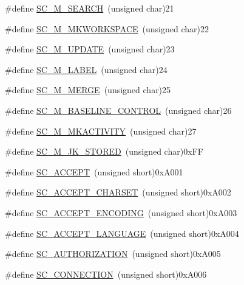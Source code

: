 \begin{DoxyCompactItemize}
\item 
\#define \hyperlink{group__AJP__defines_ga176f8a8d190ca4a417746c92d4d426f7}{S\+C\+\_\+\+M\+\_\+\+S\+E\+A\+R\+CH}~(unsigned char)21
\item 
\#define \hyperlink{group__AJP__defines_ga44a79edc18306269e01f153ea2643d75}{S\+C\+\_\+\+M\+\_\+\+M\+K\+W\+O\+R\+K\+S\+P\+A\+CE}~(unsigned char)22
\item 
\#define \hyperlink{group__AJP__defines_gad432ce2bf642c9dbdb6a300699064ecc}{S\+C\+\_\+\+M\+\_\+\+U\+P\+D\+A\+TE}~(unsigned char)23
\item 
\#define \hyperlink{group__AJP__defines_ga3ea5cf3959d98e29493c699e00ea7aae}{S\+C\+\_\+\+M\+\_\+\+L\+A\+B\+EL}~(unsigned char)24
\item 
\#define \hyperlink{group__AJP__defines_ga96f716b56251ef6c949e280c7478d676}{S\+C\+\_\+\+M\+\_\+\+M\+E\+R\+GE}~(unsigned char)25
\item 
\#define \hyperlink{group__AJP__defines_gad507a3f38b3513073d70f47d79dd57c9}{S\+C\+\_\+\+M\+\_\+\+B\+A\+S\+E\+L\+I\+N\+E\+\_\+\+C\+O\+N\+T\+R\+OL}~(unsigned char)26
\item 
\#define \hyperlink{group__AJP__defines_gad253eeccaa8cb9c572a6feaf5a8fb744}{S\+C\+\_\+\+M\+\_\+\+M\+K\+A\+C\+T\+I\+V\+I\+TY}~(unsigned char)27
\item 
\#define \hyperlink{group__AJP__defines_ga27c824b2d3a5e53334012aa45cd108bd}{S\+C\+\_\+\+M\+\_\+\+J\+K\+\_\+\+S\+T\+O\+R\+ED}~(unsigned char)0x\+FF
\item 
\#define \hyperlink{group__AJP__defines_ga5c0bfe1d56338c0da849a9f6c8c84f8c}{S\+C\+\_\+\+A\+C\+C\+E\+PT}~(unsigned short)0x\+A001
\item 
\#define \hyperlink{group__AJP__defines_ga5cc39265f24eca829cbb643c3b589f29}{S\+C\+\_\+\+A\+C\+C\+E\+P\+T\+\_\+\+C\+H\+A\+R\+S\+ET}~(unsigned short)0x\+A002
\item 
\#define \hyperlink{group__AJP__defines_ga412ab4e9b0333226bd71193b30bac26c}{S\+C\+\_\+\+A\+C\+C\+E\+P\+T\+\_\+\+E\+N\+C\+O\+D\+I\+NG}~(unsigned short)0x\+A003
\item 
\#define \hyperlink{group__AJP__defines_ga70a989e767d5b2c3c8eb6d21b2f11853}{S\+C\+\_\+\+A\+C\+C\+E\+P\+T\+\_\+\+L\+A\+N\+G\+U\+A\+GE}~(unsigned short)0x\+A004
\item 
\#define \hyperlink{group__AJP__defines_gafc1d95790242c8f36201a57d766092f0}{S\+C\+\_\+\+A\+U\+T\+H\+O\+R\+I\+Z\+A\+T\+I\+ON}~(unsigned short)0x\+A005
\item 
\#define \hyperlink{group__AJP__defines_gab5e84499a38f1ed2db346971e4fbb2fe}{S\+C\+\_\+\+C\+O\+N\+N\+E\+C\+T\+I\+ON}~(unsigned short)0x\+A006

\end{DoxyCompactItemize}
